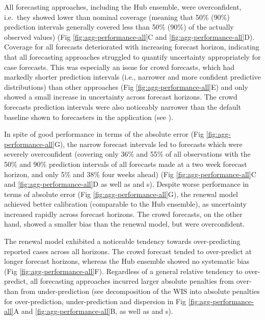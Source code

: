 \documentclass[10pt,letterpaper]{article}
\begin{document}
All forecasting approaches, including the Hub ensemble, were
overconfident, i.e.~they showed lower than nominal coverage (meaning
that 50\% (90\%) prediction intervals generally covered less than 50\%
(90\%) of the actually observed values) (Fig
\ref{fig:agg-performance-all}C and \ref{fig:agg-performance-all}D).
Coverage for all forecasts deteriorated with increasing forecast
horizon, indicating that all forecasting approaches struggled to
quantify uncertainty appropriately for case forecasts. This was
especially an issue for crowd forecasts, which had markedly shorter
prediction intervals (i.e., narrower and more confident predictive
distributions) than other approaches (Fig
\ref{fig:agg-performance-all}E) and only showed a small increase in
uncertainty across forecast horizons. The crowd forecasts prediction
intervals were also noticeably narrower than the default baseline shown
to forecasters in the application (see
).

In spite of good performance in terms of the absolute error (Fig
\ref{fig:agg-performance-all}G), the narrow forecast intervals led to
forecasts which were severely overconfident (covering only 36\% and 55\%
of all observations with the 50\% and 90\% prediction intervals of all
forecasts made at a two week forecast horizon, and only 5\% and 38\%
four weeks ahead) (Fig \ref{fig:agg-performance-all}C and
\ref{fig:agg-performance-all}D as well as 
and s). Despite worse performance in terms of
absolute error (Fig \ref{fig:agg-performance-all}G), the renewal model
achieved better calibration (comparable to the Hub ensemble), as
uncertainty increased rapidly across forecast horizons. The crowd
forecasts, on the other hand, showed a smaller bias than the renewal
model, but were overconfident.

The renewal model exhibited a noticeable tendency towards
over-predicting reported cases across all horizons. The crowd forecast
tended to over-predict at longer forecast horizons, whereas the Hub
ensemble showed no systematic bias (Fig \ref{fig:agg-performance-all}F).
Regardless of a general relative tendency to over-predict, all
forecasting approaches incurred larger absolute penalties from over-
than from under-prediction (see decomposition of the WIS into absolute
penalties for over-prediction, under-prediction and dispersion in Fig
\ref{fig:agg-performance-all}A and \ref{fig:agg-performance-all}B, as
well as  and s).
\end{document}
